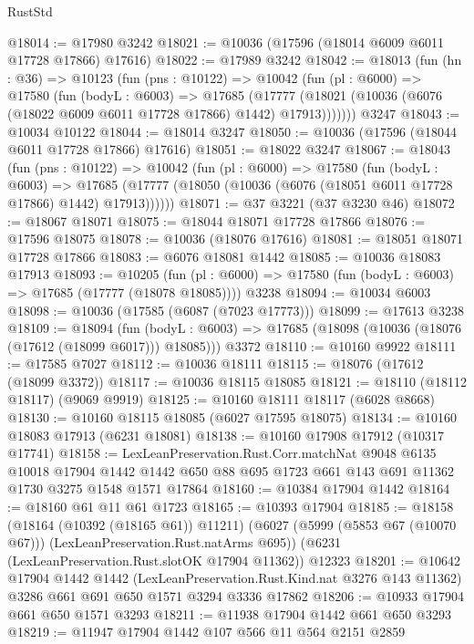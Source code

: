 \begin{lexlean}{RustStd}
\begin{coremodule}
{{@18014 := @17980 @3242
@18021 := @10036 (@17596 (@18014 @6009 @6011 @17728 @17866) @17616)
@18022 := @17989 @3242
@18042 := @18013
    (fun (hn : @36) =>
    @10123
      (fun (pns : @10122) =>
      @10042
        (fun (pl : @6000) =>
        @17580
          (fun (bodyL : @6003) =>
          @17685
            (@17777 (@18021 (@10036 (@6076 (@18022 @6009 @6011 @17728 @17866) @1442) @17913)))))))
    @3247
@18043 := @10034 @10122
@18044 := @18014 @3247
@18050 := @10036 (@17596 (@18044 @6011 @17728 @17866) @17616)
@18051 := @18022 @3247
@18067 := @18043
    (fun (pns : @10122) =>
    @10042
      (fun (pl : @6000) =>
      @17580
        (fun (bodyL : @6003) =>
        @17685 (@17777 (@18050 (@10036 (@6076 (@18051 @6011 @17728 @17866) @1442) @17913))))))
@18071 := @37 @3221 (@37 @3230 @46)
@18072 := @18067 @18071
@18075 := @18044 @18071 @17728 @17866
@18076 := @17596 @18075
@18078 := @10036 (@18076 @17616)
@18081 := @18051 @18071 @17728 @17866
@18083 := @6076 @18081 @1442
@18085 := @10036 @18083 @17913
@18093 := @10205
    (fun (pl : @6000) => @17580 (fun (bodyL : @6003) => @17685 (@17777 (@18078 @18085))))
    @3238
@18094 := @10034 @6003
@18098 := @10036 (@17585 (@6087 (@7023 @17773)))
@18099 := @17613 @3238
@18109 := @18094
    (fun (bodyL : @6003) => @17685 (@18098 (@10036 (@18076 (@17612 (@18099 @6017))) @18085)))
    @3372
@18110 := @10160 @9922
@18111 := @17585 @7027
@18112 := @10036 @18111
@18115 := @18076 (@17612 (@18099 @3372))
@18117 := @10036 @18115 @18085
@18121 := @18110 (@18112 @18117) (@9069 @9919)
@18125 := @10160 @18111 @18117 (@6028 @8668)
@18130 := @10160 @18115 @18085 (@6027 @17595 @18075)
@18134 := @10160 @18083 @17913 (@6231 @18081)
@18138 := @10160 @17908 @17912 (@10317 @17741)
@18158 := LexLeanPreservation.Rust.Corr.matchNat
    @9048
    @6135
    @10018
    @17904
    @1442
    @1442
    @650
    @88
    @695
    @1723
    @661
    @143
    @691
    @11362
    @1730
    @3275
    @1548
    @1571
    @17864
@18160 := @10384 @17904 @1442
@18164 := @18160 @61 @11 @61 @1723
@18165 := @10393 @17904
@18185 := @18158
    (@18164 (@10392 (@18165 @61)) @11211)
    (@6027 (@5999 (@5853 @67 (@10070 @67))) (LexLeanPreservation.Rust.natArms @695))
    (@6231 (LexLeanPreservation.Rust.slotOK @17904 @11362))
    @12323
@18201 := @10642
    @17904
    @1442
    @1442
    (LexLeanPreservation.Rust.Kind.nat @3276 @143 @11362)
    @3286
    @661
    @691
    @650
    @1571
    @3294
    @3336
    @17862
@18206 := @10933 @17904 @661 @650 @1571 @3293
@18211 := @11938 @17904 @1442 @661 @650 @3293
@18219 := @11947 @17904 @1442 @107 @566 @11 @564 @2151 @2859
}}
\end{coremodule}
\end{lexlean}
